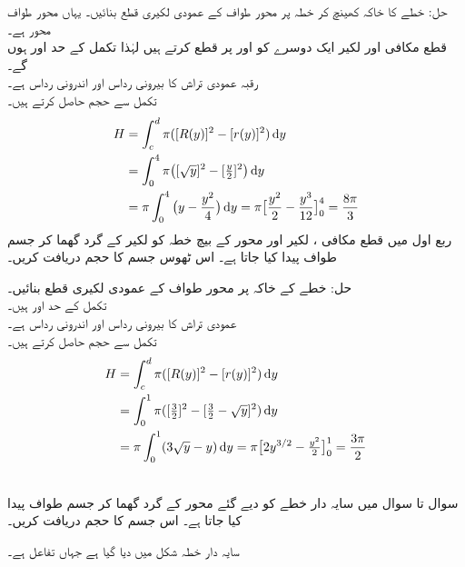 حل:\quad
{}\quad
خطے کا خاکہ کھینچ کر خطہ پر محور طواف کے عمودی لکیری قطع بنائیں۔ یہاں محور طواف  محور ہے۔\\
\quad
قطع مکافی اور لکیر ایک دوسرے کو  اور  پر قطع کرتے ہیں لہٰذا تکمل کے حد  اور  ہوں گے۔\\
\quad
رقبہ عمودی تراش کا بیرونی رداس  اور اندرونی رداس  ہے۔\\
\quad
تکمل سے حجم حاصل کرتے ہیں۔
\begin{align*}
H&=\int_c^d\pi([R(y)]^2-[r(y)]^2)\dif y\\
&=\int_0^4\pi\big([\sqrt{y}]^2-[\tfrac{y}{2}]^2\big)\dif y\\
&=\pi\int_0^4\big(y-\frac{y^2}{4}\big)\dif y=\pi\big[\frac{y^2}{2}-\frac{y^3}{12}\big]_0^4=\frac{8\pi}{3}
\end{align*} 
ربع اول میں قطع مکافی ، لکیر  اور  محور  کے بیچ خطہ کو لکیر  کے گرد گھما کر جسم طواف پیدا کیا جاتا ہے۔ اس ٹھوس جسم کا حجم دریافت کریں۔

حل:\quad
{}\quad
خطے کے خاکہ پر محور طواف  کے عمودی لکیری قطع بنائیں۔\\
\quad
تکمل کے حد  اور  ہیں۔\\
\quad
عمودی تراش کا بیرونی رداس  اور اندرونی رداس  ہے۔\\
\quad
تکمل سے حجم حاصل کرتے ہیں۔
\begin{align*}
H&=\int_c^d\pi([R(y)]^2-[r(y)]^2)\dif y\\
&=\int_0^1\pi([\tfrac{3}{2}]^2-[\tfrac{3}{2}-\sqrt{y}]^2)\dif y\\
&=\pi\int_0^1(3\sqrt{y}-y)\dif y=\pi\big[2y^{3/2}-\tfrac{y^2}{2}\big]_0^1=\frac{3\pi}{2}
\end{align*}

\\
سوال  تا سوال  میں سایہ دار خطے کو دیے گئے محور کے گرد گھما کر جسم طواف پیدا کیا جاتا ہے۔ اس جسم کا حجم دریافت کریں۔

سایہ دار خطہ شکل  میں دیا گیا ہے جہاں تفاعل  ہے۔

